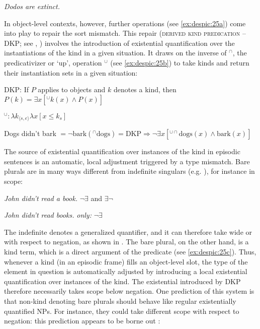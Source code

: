 \documentclass[output=paper,
modfonts
]{langscibook}
\begin{document}
	\ea \label{ex:despic:24}
	\textit{Dodos are extinct.} 
	\z 
	
	In object-level contexts, however, further operations (see \ref{ex:despic:25a}) come into play to repair the sort mismatch. This repair (\textsc{derived kind predication} -- DKP; see \citealt[364]{Chierchia1998}, \citealt[399]{Dayal2004}) involves the introduction of existential quantification over the instantiations of the kind in a given situation. It draws on the inverse of $^\cap$, the predicativizer or `up', operation $^\cup$ (see \ref{ex:despic:25b}) to take kinds and return their instantiation sets in a given situation:
	
	\ea \label{ex:despic:25}
	\ea \label{ex:despic:25a}
	DKP: If $P$ applies to objects and $k$ denotes a kind, then $P(k)=\exists x[^\cup k(x)\wedge P(x)]$
	
	\ex \label{ex:despic:25b}
	$^\cup: \lambda k_{\langle s,e\rangle}\lambda x[x\leq k_s]$ 
	
	\ex \label{ex:despic:25c}
	Dogs didn't bark $=\neg\textrm{bark}(^\cap \textrm{dogs})=\textrm{DKP}\Rightarrow\neg\exists x[^{\cup\cap}\textrm{dogs}(x)\wedge\textrm{bark}(x)]$
	
	\z 
	\z 
	
	The source of existential quantification over instances of the kind in episodic sentences is an automatic, local adjustment triggered by a type mismatch. Bare plurals are in many ways different from indefinite singulars (e.g. \citealt{Carlson1977}), for instance in scope:
	
	\ea \label{ex:despic:26}
	\ea \label{ex:despic:26a}
	\textit{John didn't read a book.} \hfill$\neg\exists$ and $\exists\neg$\hspace{75pt}
	
	\ex \label{ex:despic:26b}
	\textit{John didn't read books.} \hfill\textit{only:} $\neg\exists$\hspace{75pt} 
	
	\z 
	\z 
	
	The indefinite denotes a generalized quantifier, and it can therefore take wide or  with respect to negation, as shown in . The bare plural, on the other hand, is a kind term, which is a direct argument of the predicate (see \ref{ex:despic:25c}). Thus, whenever a kind (in an episodic
	frame) fills an object-level slot, the type of the element in question is automatically adjusted by introducing a local existential quantification over instances of the kind. The existential introduced by DKP therefore necessarily takes scope below negation. One prediction of this system is that non-kind denoting bare plurals should behave like regular existentially quantified
	NPs. For instance, they could take different scope with respect to negation: this prediction appears to be borne out \citep{Carlson1977, Chierchia1998}:
	
\end{document}
